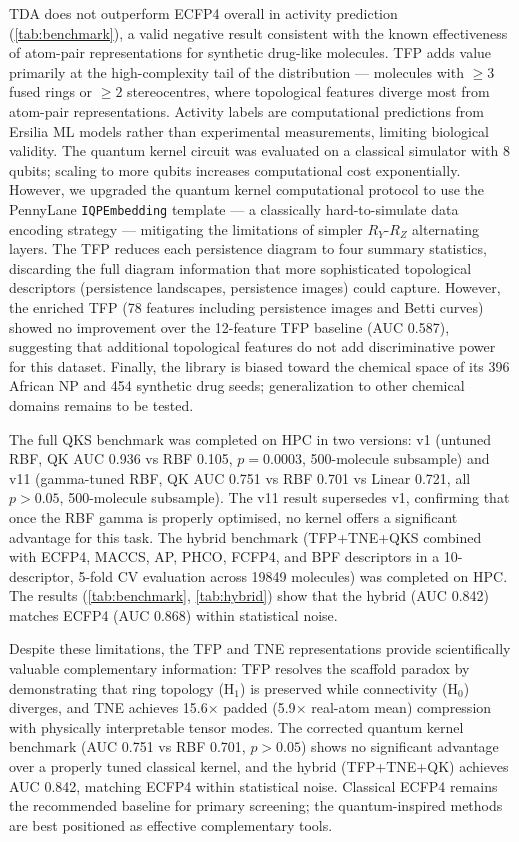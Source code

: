 \documentclass[11pt,a4paper]{article}
\begin{document}
TDA does not outperform ECFP4 overall in activity prediction (\cref{tab:benchmark}), a valid negative result consistent with the known effectiveness of atom-pair representations for synthetic drug-like molecules. TFP adds value primarily at the high-complexity tail of the distribution --- molecules with $\geq 3$ fused rings or $\geq 2$ stereocentres, where topological features diverge most from atom-pair representations. Activity labels are computational predictions from Ersilia ML models rather than experimental measurements, limiting biological validity. The quantum kernel circuit was evaluated on a classical simulator with 8 qubits; scaling to more qubits increases computational cost exponentially. However, we upgraded the quantum kernel computational protocol to use the PennyLane \texttt{IQPEmbedding} template --- a classically hard-to-simulate data encoding strategy --- mitigating the limitations of simpler $R_Y$-$R_Z$ alternating layers. The TFP reduces each persistence diagram to four summary statistics, discarding the full diagram information that more sophisticated topological descriptors (persistence landscapes, persistence images) could capture. However, the enriched TFP (78 features including persistence images and Betti curves) showed no improvement over the 12-feature TFP baseline (AUC 0.587), suggesting that additional topological features do not add discriminative power for this dataset. Finally, the library is biased toward the chemical space of its 396 African NP and 454 synthetic drug seeds; generalization to other chemical domains remains to be tested.

The full QKS benchmark was completed on HPC in two versions: v1 (untuned RBF, QK AUC 0.936 vs RBF 0.105, $p = \num{0.0003}$, 500-molecule subsample) and v11 (gamma-tuned RBF, QK AUC 0.751 vs RBF 0.701 vs Linear 0.721, all $p > \num{0.05}$, 500-molecule subsample). The v11 result supersedes v1, confirming that once the RBF gamma is properly optimised, no kernel offers a significant advantage for this task. The hybrid benchmark (TFP+TNE+QKS combined with ECFP4, MACCS, AP, PHCO, FCFP4, and BPF descriptors in a \num{10}-descriptor, \num{5}-fold CV evaluation across \num{19849} molecules) was completed on HPC. The results (\cref{tab:benchmark}, \cref{tab:hybrid}) show that the hybrid (AUC 0.842) matches ECFP4 (AUC 0.868) within statistical noise.

Despite these limitations, the TFP and TNE representations provide scientifically valuable complementary information: TFP resolves the scaffold paradox by demonstrating that ring topology (H$_1$) is preserved while connectivity (H$_0$) diverges, and TNE achieves \num{15.6}$\times$ padded (\num{5.9}$\times$ real-atom mean) compression with physically interpretable tensor modes. The corrected quantum kernel benchmark (AUC 0.751 vs RBF 0.701, $p > 0.05$) shows no significant advantage over a properly tuned classical kernel, and the hybrid (TFP+TNE+QK) achieves AUC 0.842, matching ECFP4 within statistical noise. Classical ECFP4 remains the recommended baseline for primary screening; the quantum-inspired methods are best positioned as effective complementary tools.
\end{document}
